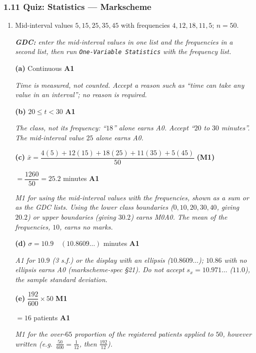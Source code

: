 \documentclass[12pt, twoside]{article}
\begin{document}
\subsubsection*{1.11 Quiz: Statistics --- Markscheme}

\begin{enumerate}[itemsep=0.3cm]

\item[1.] [Maximum mark: 7]

Mid-interval values $5, 15, 25, 35, 45$ with frequencies $4, 12, 18, 11, 5$;
$n = 50$.

\emph{\textbf{GDC:} enter the mid-interval values in one list and the
frequencies in a second list, then run \texttt{One-Variable Statistics} with
the frequency list.}

\textbf{(a)} Continuous \hfill \textbf{A1}

\emph{Time is measured, not counted. Accept a reason such as ``time can
take any value in an interval''; no reason is required.}

\textbf{(b)} $20 \le t < 30$ \hfill \textbf{A1}

\emph{The class, not its frequency: ``$18$'' alone earns A0. Accept
``$20$ to $30$ minutes''. The mid-interval value $25$ alone earns A0.}

\textbf{(c)} $\bar{x} = \dfrac{4(5) + 12(15) + 18(25) + 11(35) + 5(45)}{50}$
\hfill \textbf{(M1)}

$= \dfrac{1260}{50} = 25.2$ minutes \hfill \textbf{A1}

\emph{M1 for using the mid-interval values with the frequencies, shown as a
sum or as the GDC lists. Using the lower class boundaries
($0, 10, 20, 30, 40$, giving $20.2$) or upper boundaries (giving $30.2$)
earns M0A0. The mean of the frequencies, $10$, earns no marks.}

\textbf{(d)} $\sigma = 10.9 \quad (10.8609\ldots)$ minutes \hfill \textbf{A1}

\emph{A1 for $10.9$ (3 s.f.) or the display with an ellipsis
($10.8609\ldots$); $10.86$ with no ellipsis earns A0 (markscheme-spec §21). Do not accept $s_{x} = 10.971\ldots$
($11.0$), the sample standard deviation.}

\textbf{(e)} $\dfrac{192}{600} \times 50$ \hfill \textbf{M1}

$= 16$ patients \hfill \textbf{A1}

\emph{M1 for the over-$65$ proportion of the registered patients applied to
$50$, however written (e.g.\ $\frac{50}{600} = \frac{1}{12}$, then
$\frac{192}{12}$).}


\end{enumerate}
\end{document}
